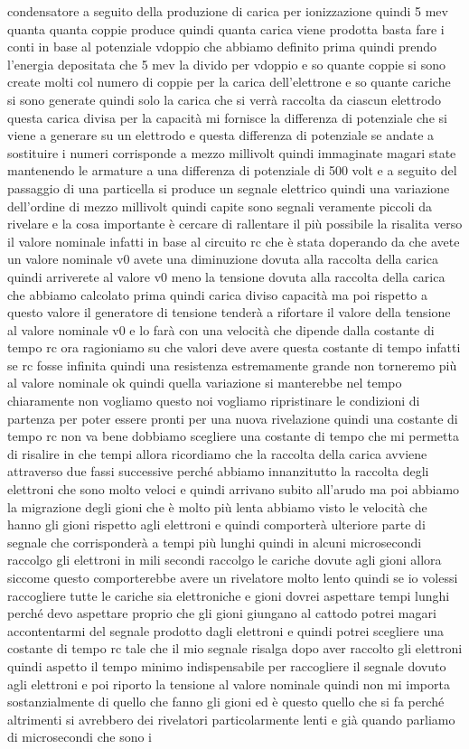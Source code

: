 {condensatore a seguito della produzione di carica per ionizzazione quindi 5 mev quanta quanta coppie produce quindi quanta carica viene prodotta basta fare i conti in base al potenziale vdoppio che abbiamo definito prima quindi prendo l'energia depositata che 5 mev la divido per vdoppio e so quante coppie si sono create molti col numero di coppie per la carica dell'elettrone e so quante cariche si sono generate quindi solo la carica che si verrà raccolta da ciascun elettrodo questa carica divisa per la capacità mi fornisce la differenza di potenziale che si viene a generare su un elettrodo e questa differenza di potenziale se andate a sostituire i numeri corrisponde a mezzo millivolt quindi immaginate magari state mantenendo le armature a una differenza di potenziale di 500 volt e a seguito del passaggio di una particella si produce un segnale elettrico quindi una variazione dell'ordine di mezzo millivolt quindi capite sono segnali veramente piccoli da rivelare e la cosa importante è cercare di rallentare il più possibile la risalita verso il valore nominale infatti in base al circuito rc che è stata doperando da che avete un valore nominale v0 avete una diminuzione dovuta alla raccolta della carica quindi arriverete al valore v0 meno la tensione dovuta alla raccolta della carica che abbiamo calcolato prima quindi carica diviso capacità ma poi rispetto a questo valore il generatore di tensione tenderà a rifortare il valore della tensione al valore nominale v0 e lo farà con una velocità che dipende dalla costante di tempo rc ora ragioniamo su che valori deve avere questa costante di tempo infatti se rc fosse infinita quindi una resistenza estremamente grande non torneremo più al valore nominale ok quindi quella variazione si manterebbe nel tempo chiaramente non vogliamo questo noi vogliamo ripristinare le condizioni di partenza per poter essere pronti per una nuova rivelazione quindi una costante di tempo rc non va bene dobbiamo scegliere una costante di tempo che mi permetta di risalire in che tempi allora ricordiamo che la raccolta della carica avviene attraverso due fassi successive perché abbiamo innanzitutto la raccolta degli elettroni che sono molto veloci e quindi arrivano subito all'arudo ma poi abbiamo la migrazione degli gioni che è molto più lenta abbiamo visto le velocità che hanno gli gioni rispetto agli elettroni e quindi comporterà ulteriore parte di segnale che corrisponderà a tempi più lunghi quindi in alcuni microsecondi raccolgo gli elettroni in mili secondi raccolgo le cariche dovute agli gioni allora siccome questo comporterebbe avere un rivelatore molto lento quindi se io volessi raccogliere tutte le cariche sia elettroniche e gioni dovrei aspettare tempi lunghi perché devo aspettare proprio che gli gioni giungano al cattodo potrei magari accontentarmi del segnale prodotto dagli elettroni e quindi potrei scegliere una costante di tempo rc tale che il mio segnale risalga dopo aver raccolto gli elettroni quindi aspetto il tempo minimo indispensabile per raccogliere il segnale dovuto agli elettroni e poi riporto la tensione al valore nominale quindi non mi importa sostanzialmente di quello che fanno gli gioni ed è questo quello che si fa perché altrimenti si avrebbero dei rivelatori particolarmente lenti e già quando parliamo di microsecondi che sono i }

